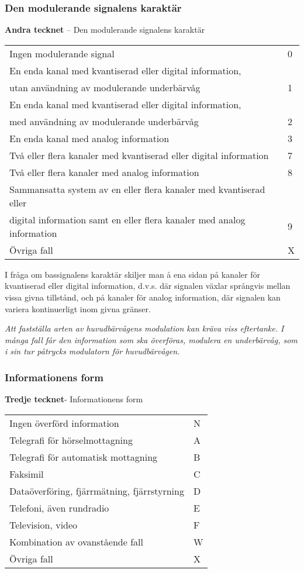 \subsubsection{Den modulerande signalens karaktär}
\textbf{Andra tecknet} -- Den modulerande signalens karaktär\\
\begin{tabular}{ll}
	Ingen modulerande signal & 0\\
	En enda kanal med kvantiserad eller digital information, &\\
	utan användning av modulerande underbärvåg & 1\\
	En enda kanal med kvantiserad eller digital information, &\\
	med användning av modulerande underbärvåg & 2\\
	En enda kanal med analog information & 3\\
	Två eller flera kanaler med kvantiserad eller digital information & 7\\
	Två eller flera kanaler med analog information & 8\\
	Sammansatta system av en eller flera kanaler med kvantiserad eller & \\
	digital information samt en eller flera kanaler med analog information & 9\\
	Övriga fall & X\\
\end{tabular}

I fråga om bassignalens karaktär skiljer
man å ena sidan på kanaler för kvantiserad eller digital information, d.v.s. där
signalen växlar språngvis mellan vissa givna tillstånd, och på kanaler för
analog information, där signalen kan variera kontinuerligt inom givna gränser.

\emph{Att fastställa arten av huvudbärvågens modulation kan kräva viss
	eftertanke. I många fall får den information som ska överföras, modulera en
	underbärvåg, som i sin tur påtrycks modulatorn för huvudbärvågen.}

\subsubsection{Informationens form}
\textbf{Tredje tecknet}- Informationens form\\
\begin{tabular}{ll}
	Ingen överförd information & N\\
	Telegrafi för hörselmottagning & A\\
	Telegrafi för automatisk mottagning & B\\
	Faksimil & C\\
	Dataöverföring, fjärrmätning, fjärrstyrning & D\\
	Telefoni, även rundradio & E\\
	Television, video & F\\
	Kombination av ovanstående fall & W\\
	Övriga fall & X\\
\end{tabular}

